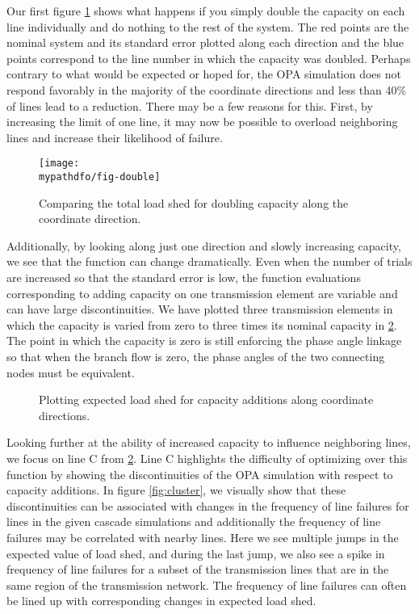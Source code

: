 Our first figure \cref{fig:double} shows what happens if you simply double the capacity on each line individually and do nothing to the rest of the system.  The red points are the nominal system and its standard error plotted along each direction and the blue points correspond to the line number in which the capacity was doubled. Perhaps contrary to what would be expected or hoped for, the OPA simulation does not respond favorably in the majority of the coordinate directions and less than 40\% of lines lead to a reduction.  There may be a few reasons for this.  First, by increasing the limit of one line, it may now be possible to overload neighboring lines and increase their likelihood of failure. 

\begin{figure}
\centering
\texttt{[image: \\mypathdfo/fig-double]}
\caption{Comparing the total load shed for doubling capacity along the coordinate direction.}
\label{fig:double}
\end{figure}

Additionally, by looking along just one direction and slowly increasing capacity, we see that the function can change dramatically.  Even when the number of trials are increased so that the standard error is low, the function evaluations corresponding to adding capacity on one transmission element are variable and can have large discontinuities.  We have plotted three transmission elements in which the capacity is varied from zero to three times its nominal capacity in \cref{fig:capadd}.  The point in which the capacity is zero is still enforcing the phase angle linkage so that when the branch flow is zero, the phase angles of the two connecting nodes must be equivalent.


\begin{figure}

	\caption{Plotting expected load shed for capacity additions along coordinate directions.  }
\label{fig:capadd}
\end{figure}

Looking further at the ability of increased capacity to influence neighboring lines, we focus on line C from \cref{fig:capadd}.  Line C highlights the difficulty of optimizing over this function by showing the discontinuities of the OPA simulation with respect to capacity additions.  In figure \cref{fig:cluster}, we visually show that these discontinuities can be associated with changes in the frequency of line failures for lines in the given cascade simulations and additionally the frequency of line failures may be correlated with nearby lines.  Here we see multiple jumps in the expected value of load shed, and during the last jump, we also see a spike in frequency of line failures for a subset of the transmission lines that are in the same region of the transmission network.  The frequency of line failures can often be lined up with corresponding changes in expected load shed.

